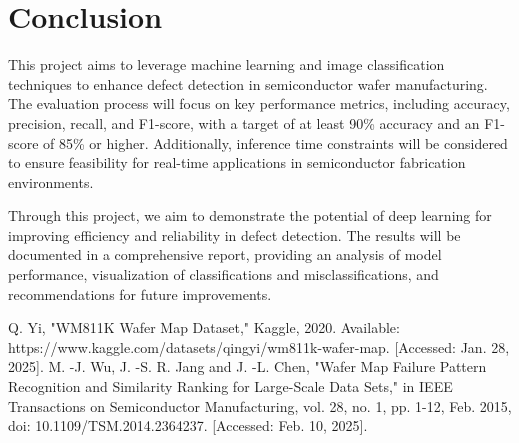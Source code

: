 \documentclass[conference]{IEEEtran}
\begin{document}
\section{Conclusion}
This project aims to leverage machine learning and image classification techniques to enhance defect detection in semiconductor wafer manufacturing. 
The evaluation process will focus on key performance metrics, including accuracy, precision, recall, and F1-score, with a target of at least 90\% accuracy and an F1-score of 85\% or higher. 
Additionally, inference time constraints will be considered to ensure feasibility for real-time applications in semiconductor fabrication environments.

Through this project, we aim to demonstrate the potential of deep learning for improving efficiency and reliability in defect detection. 
The results will be documented in a comprehensive report, providing an analysis of model performance, visualization of classifications and misclassifications, and recommendations for future improvements. 

\begin{thebibliography}{00}
 Q. Yi, "WM811K Wafer Map Dataset," Kaggle, 2020. Available: https://www.kaggle.com/datasets/qingyi/wm811k-wafer-map. [Accessed: Jan. 28, 2025].
 M. -J. Wu, J. -S. R. Jang and J. -L. Chen, "Wafer Map Failure Pattern Recognition and Similarity Ranking for Large-Scale Data Sets," in IEEE Transactions on Semiconductor Manufacturing, vol. 28, no. 1, pp. 1-12, Feb. 2015, doi: 10.1109/TSM.2014.2364237. [Accessed: Feb. 10, 2025].
\end{thebibliography}
\end{document}
